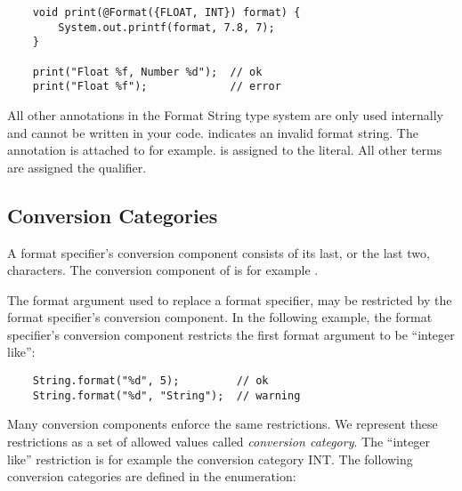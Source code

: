 \begin{Verbatim}
    void print(@Format({FLOAT, INT}) format) {
        System.out.printf(format, 7.8, 7);
    } 

    print("Float %f, Number %d");  // ok
    print("Float %f");             // error
\end{Verbatim}

\noindent All other annotations in the Format String type system are only used
internally and cannot be written in your code.
 indicates an invalid format
string. The annotation is attached to 
for example.   is assigned to the
 literal. All other terms are assigned the
 qualifier.

\subsection{Conversion Categories\label{formatter-categories}}

A format specifier's conversion component consists of its last, or the last two,
characters. The conversion component of  is for example .

The format argument used to replace a format specifier, may be restricted 
by the format specifier's conversion component. In the following example, the
format specifier's conversion component  restricts the first format argument
to be ``integer like'':

\begin{Verbatim}
    String.format("%d", 5);         // ok
    String.format("%d", "String");  // warning
\end{Verbatim}

\noindent Many conversion components enforce the same restrictions. We represent
these restrictions as a set of allowed values called \emph{conversion
category}. The ``integer like'' restriction is for example the conversion
category INT.  The following conversion categories are defined in the
 enumeration:

